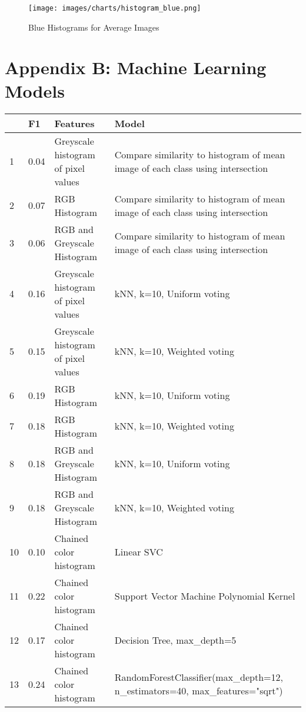 \documentclass[10pt,a4paper]{article}
\begin{document}
\begin{figure}[t!]
  \caption{Blue Histograms for Average Images}
  \texttt{[image: images/charts/histogram\_blue.png]}
  \label{fig:blue-histograms}
\end{figure}

\clearpage
\section{Appendix B: Machine Learning Models} \label{App:AppendixB}

\begin{table}[h]
\small
\begin{tabular}{ | p{0.5cm} | p{0.7cm} | p{5cm} | p{8cm} | }
\hline
	 & \textbf{F1} & \textbf{Features} & \textbf{Model} \\ \hline
	1 & 0.04 & Greyscale histogram of pixel values & Compare similarity to histogram of mean image of each class using intersection \\ \hline
	2 & 0.07 & RGB Histogram & Compare similarity to histogram of mean image of each class using intersection \\ \hline
	3 & 0.06 & RGB and Greyscale Histogram & Compare similarity to histogram of mean image of each class using intersection \\ \hline
	4 & 0.16 & Greyscale histogram of pixel values & kNN, k=10, Uniform voting \\ \hline
	5 & 0.15 & Greyscale histogram of pixel values & kNN, k=10, Weighted voting \\ \hline
	6 & 0.19 & RGB Histogram & kNN, k=10, Uniform voting \\ \hline
	7 & 0.18 & RGB Histogram & kNN, k=10, Weighted voting \\ \hline
	8 & 0.18 & RGB and Greyscale Histogram & kNN, k=10, Uniform voting \\ \hline
	9 & 0.18 & RGB and Greyscale Histogram & kNN, k=10, Weighted voting \\ \hline
	10 & 0.10 & Chained color histogram & Linear SVC \\ \hline
	11 & 0.22 & Chained color histogram & Support Vector Machine Polynomial Kernel \\ \hline
	12 & 0.17 & Chained color histogram & Decision Tree, max\_depth=5 \\ \hline
	13 & 0.24 & Chained color histogram & RandomForestClassifier(max\_depth=12, n\_estimators=40, max\_features="sqrt") \\ \hline

\end{tabular}
\end{table}
\end{document}
